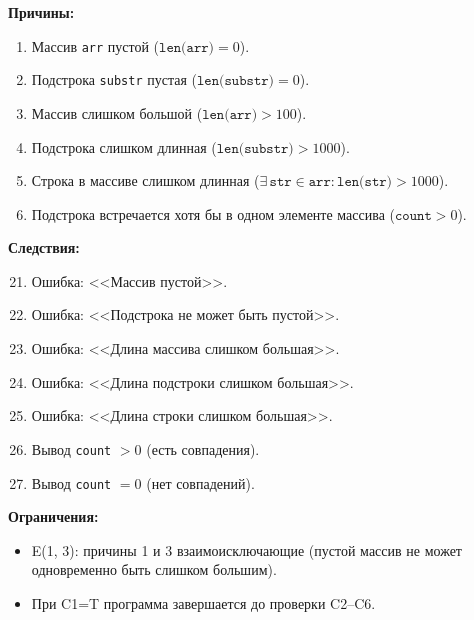 \documentclass{article}[14pt]
\begin{document}
\textbf{Причины:}
\begin{enumerate}
    \item Массив \texttt{arr} пустой ($\texttt{len(arr)} = 0$).
    \item Подстрока \texttt{substr} пустая ($\texttt{len(substr)} = 0$).
    \item Массив слишком большой ($\texttt{len(arr)} > 100$).
    \item Подстрока слишком длинная ($\texttt{len(substr)} > 1000$).
    \item Строка в массиве слишком длинная ($\exists\, \texttt{str} \in \texttt{arr}: \texttt{len(str)} > 1000$).
    \item Подстрока встречается хотя бы в одном элементе массива ($\texttt{count} > 0$).
\end{enumerate}

\textbf{Следствия:}
\begin{enumerate}
    \setcounter{enumi}{20}
    \item Ошибка: <<Массив пустой>>.
    \item Ошибка: <<Подстрока не может быть пустой>>.
    \item Ошибка: <<Длина массива слишком большая>>.
    \item Ошибка: <<Длина подстроки слишком большая>>.
    \item Ошибка: <<Длина строки слишком большая>>.
    \item Вывод \texttt{count} $> 0$ (есть совпадения).
    \item Вывод \texttt{count} $= 0$ (нет совпадений).
\end{enumerate}

\textbf{Ограничения:}
\begin{itemize}
    \item E(1, 3): причины 1 и 3 взаимоисключающие (пустой массив не может одновременно быть слишком большим).
    \item При C1=T программа завершается до проверки C2--C6.
\end{itemize}
\end{document}
